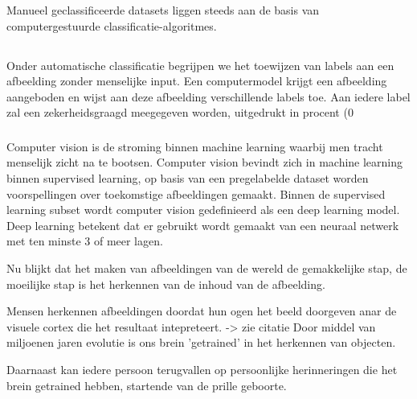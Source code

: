 Manueel geclassificeerde datasets liggen steeds aan de basis van computergestuurde classificatie-algoritmes.

\subsection{}
\label{sec:automatic-classification}
Onder automatische classificatie begrijpen we het toewijzen van labels aan een afbeelding zonder menselijke input. Een computermodel krijgt een afbeelding aangeboden en wijst aan deze afbeelding verschillende labels toe. Aan iedere label zal een zekerheidsgraagd meegegeven worden, uitgedrukt in procent (0%

\subsubsection{}
\label{sec:computer-vision}
Computer vision is de stroming binnen machine learning waarbij men tracht menselijk zicht na te bootsen. Computer vision bevindt zich in machine learning binnen supervised learning, op basis van een pregelabelde dataset worden voorspellingen over toekomstige afbeeldingen gemaakt.
Binnen de supervised learning subset wordt computer vision gedefinieerd als een deep learning model. Deep learning betekent dat er gebruikt wordt gemaakt van een neuraal netwerk met ten minste 3 of meer lagen.



Nu blijkt dat het maken van afbeeldingen van de wereld de gemakkelijke stap, de moeilijke stap is het herkennen van de inhoud van de afbeelding.

Mensen herkennen afbeeldingen doordat hun ogen het beeld doorgeven anar de visuele cortex die het resultaat intepreteert. -> zie citatie
Door middel van miljoenen jaren evolutie is ons brein 'getrained' in het herkennen van objecten.

Daarnaast kan iedere persoon terugvallen op persoonlijke herinneringen die het brein getrained hebben, startende van de prille geboorte.

